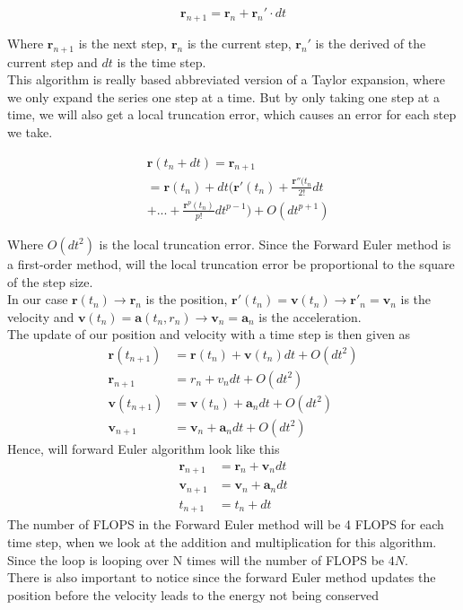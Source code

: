 \documentclass{article}
\begin{document}
\begin{multicols}{2}
\begin{equation}
\mathbf{r}_{n+1}=\mathbf{r}_n + \mathbf{r}_n'\cdot dt
\label{eq:yn1}
\end{equation}

Where $\mathbf{r}_{n+1}$ is the next step, $\mathbf{r}_n$ is the current step, $\mathbf{r}_n'$ is the derived of the current step and $dt$ is the time step.\\
This algorithm is really based abbreviated version of a Taylor expansion, where we only expand the series one step at a time. But by only taking one step at a time, we will also get a local truncation error, which causes an error for each step we take. 

\begin{equation}
\begin{split}
&\mathbf{r}(t_n+dt)=\mathbf{r}_{n+1}\\
&=\mathbf{r}(t_n)+dt\bigg(\mathbf{r}'(t_n) + \frac{\mathbf{r}''(t_n}{2!}dt\\
&+ ... + \frac{\mathbf{r}^p(t_n)}{p!}dt^{p-1}\bigg) + O(dt^{p+1})
\end{split}
\label{eq:ytndt}
\end{equation} 

Where $O(dt^2)$ is the local truncation error. Since the Forward Euler method is a first-order method, will the local truncation error be proportional to the square of the step size. \\
In our case $\mathbf{r}(t_n) \rightarrow \mathbf{r}_n$ is the position, $\mathbf{r}'(t_n)=\mathbf{v}(t_n) \rightarrow \mathbf{r}'_n=\mathbf{v}_n$ is the velocity and $\mathbf{v}(t_n)=\mathbf{a}(t_n,r_n) \rightarrow \mathbf{v}_n=\mathbf{a}_n$ is the acceleration.\\
The update of our position and velocity with a  time step is then given as  
\begin{align}
    \mathbf{r}(t_{n+1})&=\mathbf{r}(t_n) + \mathbf{v}(t_n)dt + O(dt^2)\\
    \mathbf{r}_{n+1}&=r_{n} + v_{n}dt + O(dt^2)\\
    \mathbf{v}(t_{n+1})&=\mathbf{v}(t_n)+\mathbf{a}_ndt + O(dt^2)\\
    \mathbf{v}_{n+1}&=\mathbf{v}_n +\mathbf{a}_n dt + O(dt^2)
\end{align}
Hence, will forward Euler algorithm look like this
\begin{align}
    \mathbf{r}_{n+1}&=\mathbf{r}_n+\mathbf{v}_ndt\\
    \mathbf{v}_{n+1}&=\mathbf{v}_n+\mathbf{a}_ndt\\
    t_{n+1}&=t_n + dt
\end{align}
The number of FLOPS in the Forward Euler method will be 4 FLOPS for each time step, when we look at the addition and multiplication for this algorithm. Since the loop is looping over N times will the number of FLOPS be $4N$. \\
There is also important to notice since the forward Euler method updates the position before the velocity leads to the energy not being conserved

\end{multicols}
\end{document}
